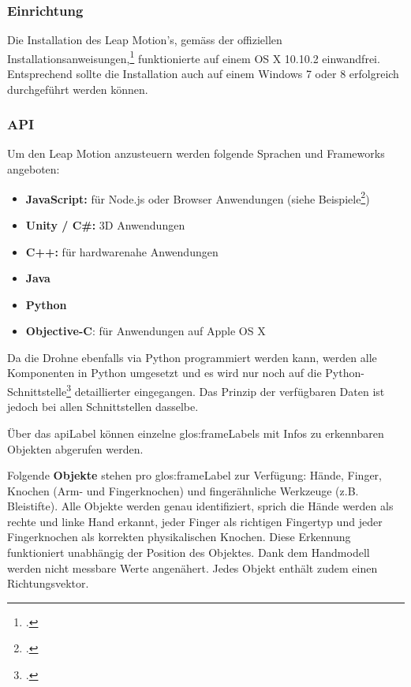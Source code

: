 \subsubsection{Einrichtung}
Die Installation des Leap Motion's, gemäss der offiziellen Installationsanweisungen,\footcite{Getting_Started_Leap_Motion_Developers_2015-03-28} funktionierte auf einem OS X 10.10.2 einwandfrei.
Entsprechend sollte  die Installation auch auf einem Windows 7 oder 8 erfolgreich durchgeführt werden können.

\subsubsection{API}
Um den Leap Motion anzusteuern werden folgende Sprachen und Frameworks angeboten:
\begin{itemize}
	\item \textbf{JavaScript:} für Node.js oder Browser Anwendungen (siehe Beispiele\footcite{Getting_Started_Leap_Motion_Developers_2015-03-28})
	\item \textbf{Unity / C\#:} 3D Anwendungen
	\item \textbf{C++:} für hardwarenahe Anwendungen
	\item \textbf{Java}
	\item \textbf{Python}
	\item \textbf{Objective-C}: für Anwendungen auf Apple OS X
\end{itemize}

Da die Drohne ebenfalls via Python programmiert werden kann, werden alle Komponenten in Python umgesetzt und es wird nur noch auf die Python-Schnittstelle\footcite{Python_SDK_Documentation__Leap_Motion_Python_SDK_v2.2_documentation_2015-03-28} detaillierter eingegangen. Das Prinzip der verfügbaren Daten ist jedoch bei allen Schnittstellen dasselbe.

Über das \gls{apiLabel} können einzelne \glspl{glos:frameLabel} mit Infos zu erkennbaren Objekten abgerufen werden.

Folgende \textbf{Objekte} stehen pro \gls{glos:frameLabel} zur Verfügung: Hände, Finger, Knochen (Arm- und Fingerknochen) und fingerähnliche Werkzeuge (z.B. Bleistifte).
Alle Objekte werden genau identifiziert, sprich die Hände werden als rechte und linke Hand erkannt, jeder Finger als richtigen Fingertyp und jeder Fingerknochen als korrekten physikalischen Knochen. Diese Erkennung funktioniert unabhängig der Position des Objektes. Dank dem Handmodell werden nicht messbare Werte angenähert.
Jedes Objekt enthält zudem einen Richtungsvektor.

